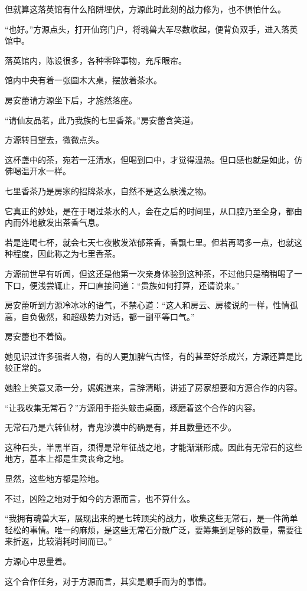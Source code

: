\begin{this_body}
但就算这落英馆有什么陷阱埋伏，方源此时此刻的战力修为，也不惧怕什么。

“也好。”方源点头，打开仙窍门户，将魂兽大军尽数收起，便背负双手，进入落英馆中。

落英馆内，陈设很多，各种零碎事物，充斥眼帘。

馆内中央有着一张圆木大桌，摆放着茶水。

房安蕾请方源坐下后，才施然落座。

“请仙友品茗，此乃我族的七里香茶。”房安蕾含笑道。

方源转目望去，微微点头。

这杯盏中的茶，宛若一汪清水，但喝到口中，才觉得温热。但口感也就是如此，仿佛喝温开水一样。

七里香茶乃是房家的招牌茶水，自然不是这么肤浅之物。

它真正的妙处，是在于喝过茶水的人，会在之后的时间里，从口腔乃至全身，都由内而外地散发出茶香气息。

若是连喝七杯，就会七天七夜散发浓郁茶香，香飘七里。但若再喝多一点，也就这种程度，因此称之为七里香茶。

方源前世早有听闻，但这还是他第一次亲身体验到这种茶，不过他只是稍稍喝了一下口，便浅尝辄止，开口直接问道：“贵族如何打算，还请说来。”

房安蕾听到方源冷冰冰的语气，不禁心道：“这人和房云、房棱说的一样，性情孤高，自负傲然，和超级势力对话，都一副平等口气。”

房安蕾也不着恼。

她见识过许多强者人物，有的人更加脾气古怪，有的甚至好杀成兴，方源还算是比较正常的。

她脸上笑意又添一分，娓娓道来，言辞清晰，讲述了房家想要和方源合作的内容。

“让我收集无常石？”方源用手指头敲击桌面，琢磨着这个合作的内容。

无常石乃是六转仙材，青鬼沙漠中的确是有，并且数量还不少。

这种石头，半黑半百，须得是常年征战之地，才能渐渐形成。因此有无常石的这些地方，基本上都是生灵丧命之地。

显然，这些地方都是险地。

不过，凶险之地对于如今的方源而言，也不算什么。

“我拥有魂兽大军，展现出来的是七转顶尖的战力，收集这些无常石，是一件简单轻松的事情。唯一的麻烦，是这些无常石分散广泛，要筹集到足够的数量，需要往来折返，比较消耗时间而已。”

方源心中思量着。

这个合作任务，对于方源而言，其实是顺手而为的事情。


\end{this_body}
